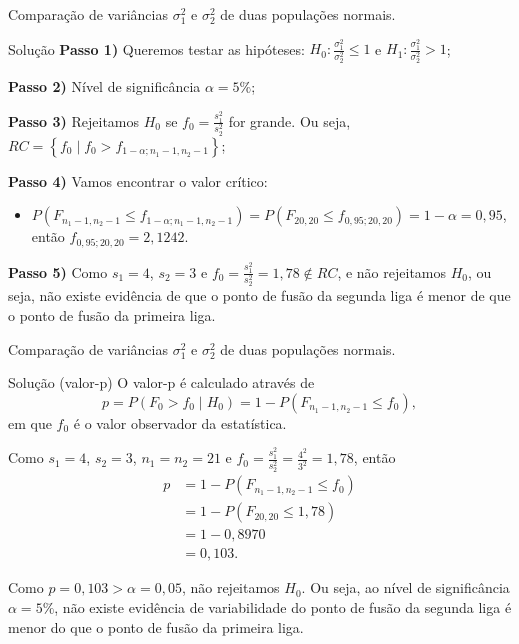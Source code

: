 \documentclass[9pt]{beamer}
\begin{document}
\begin{frame}{Comparação de variâncias $\sigma_1^2$ e $\sigma_2^2$ de duas populações normais.}

\begin{block}{Solução}
	\textbf{Passo 1)} Queremos testar as hipóteses: $H_0: \frac{\sigma_1^2}{\sigma_2^2} \leq 1$ e $H_1: \frac{\sigma_1^2}{\sigma_2^2}  > 1$;
	
	\textbf{Passo 2)} Nível de significância $\alpha=5\%$;
	
	\textbf{Passo 3)} Rejeitamos $H_0$ se $f_0 = \frac{s_1^2}{s_2^2}$ for grande. Ou seja, $RC=\left\{ f_0 \mid f_0 > f_{1-\alpha; n_1-1, n_2-1} \right\}$;
	
	\textbf{Passo 4)} Vamos encontrar o valor crítico:
	\begin{itemize}
		\item $P\left( F_{n_1-1, n_2-1} \leq f_{1-\alpha; n_1-1, n_2-1} \right) = P\left( F_{20, 20} \leq f_{0,95; 20, 20} \right) = 1-\alpha=0,95$, então $f_{0,95; 20, 20} = 2,1242$.
	\end{itemize}

	\textbf{Passo 5)} Como $s_1 = 4$, $s_2=3$ e $f_0 = \frac{s_1^2}{s_2^2} = 1,78 \not\in RC$, e não rejeitamos $H_0$, ou seja, não existe evidência de que o ponto de fusão da segunda liga é menor de que o ponto de fusão da primeira liga.
\end{block}

\end{frame}

\begin{frame}{Comparação de variâncias $\sigma_1^2$ e $\sigma_2^2$ de duas populações normais.}

\begin{block}{Solução (valor-p)}
	O valor-p é calculado através de 
	$$p=P\left( F_0 > f_0 \mid H_0 \right) =1- P\left( F_{n_1-1, n_2-1} \leq f_0  \right),$$
	em que $f_0$ é o valor observador da estatística.
	
	Como $s_1 = 4$, $s_2 = 3$, $n_1=n_2=21$ e $f_0 = \frac{s_1^2}{s_2^2}=\frac{4^2}{3^2} = 1,78$, então
	\begin{align*}
		p &= 1 - P \left( F_{n_1-1, n_2-1} \leq f_0 \right)\\
		&=1- P \left( F_{20, 20} \leq 1,78 \right)\\
		&= 1 - 0,8970\\
		&= 0,103.
	\end{align*}
	
	Como $p=0,103 > \alpha = 0,05$, não rejeitamos $H_0$. Ou seja, ao nível de significância $\alpha=5\%$, não existe evidência de variabilidade do ponto de fusão da segunda liga é menor do que o ponto de fusão da primeira liga.
\end{block}

\end{frame}
\end{document}
